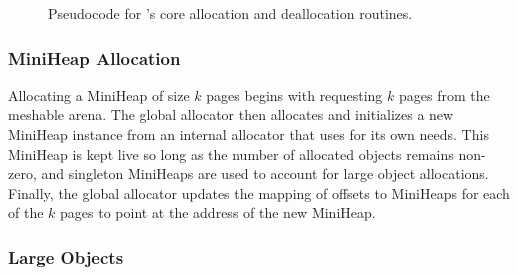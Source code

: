\begin{figure}[!t]
  \centering
  \subfloat{}
  \centering
  \subfloat{}
%  
%  
%  
%  
%  
  \caption{Pseudocode for \Mesh's core allocation and deallocation routines.}
  \label{fig:malloc}
\end{figure}



\subsubsection{MiniHeap Allocation}

Allocating a MiniHeap of size $k$ pages begins with requesting $k$
pages from the meshable arena.  The global allocator then allocates
and initializes a new MiniHeap instance from an internal allocator
that \Mesh uses for its own needs. This MiniHeap is kept live so long
as the number of allocated objects remains non-zero, and singleton
MiniHeaps are used to account for large object allocations.  Finally,
the global allocator updates the mapping of offsets to MiniHeaps for
each of the $k$ pages to point at the address of the new MiniHeap.

\subsubsection{Large Objects}

